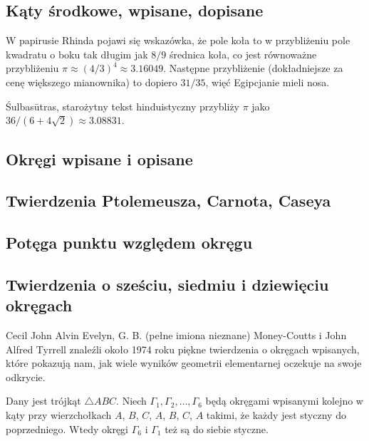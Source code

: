 \subsection{Kąty środkowe, wpisane, dopisane}

W papirusie Rhinda pojawi się wskazówka, że pole koła to w przybliżeniu pole kwadratu o boku tak długim jak $8/9$ średnica koła, co jest równoważne przybliżeniu $\pi \approx (4/3)^4 \approx 3.16049$.
Następne przybliżenie (dokładniejsze za cenę większego mianownika) to dopiero $31/35$, więć Egipcjanie mieli nosa.

Śulbasūtras, starożytny tekst hinduistyczny przybliży $\pi$ jako $36 / (6 + 4 \sqrt 2) \approx 3.08831$.



\subsection{Okręgi wpisane i opisane}


\subsection{Twierdzenia Ptolemeusza, Carnota, Caseya}


%
\subsection{Potęga punktu względem okręgu}

%

\subsection{Twierdzenia o sześciu, siedmiu i dziewięciu okręgach}
\label{sssection_6_7_9_circles}
Cecil John Alvin Evelyn, G. B. (pełne imiona nieznane) Money-Coutts i John Alfred Tyrrell znaleźli około 1974 roku piękne twierdzenia o okręgach wpisanych, które pokazują nam, jak wiele wyników geometrii elementarnej oczekuje na swoje odkrycie.

\begin{proposition}
%
	Dany jest trójkąt $\triangle ABC$.
	Niech $\Gamma_1, \Gamma_2, \ldots, \Gamma_6$ będą okręgami wpisanymi kolejno w kąty przy wierzchołkach $A$, $B$, $C$, $A$, $B$, $C$, $A$ takimi, że każdy jest styczny do poprzedniego.
	Wtedy okręgi $\Gamma_6$ i $\Gamma_1$ też są do siebie styczne.
\end{proposition}

